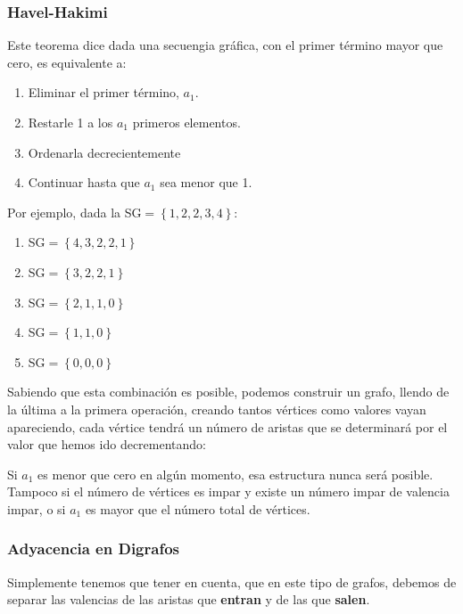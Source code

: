 \subsubsection{Havel-Hakimi}
Este teorema dice dada una secuengia gráfica, con el primer término mayor que cero, es equivalente a:
\begin{enumerate}
        \item Eliminar el primer término, \(a_1\).
        \item Restarle 1 a los \(a_1\) primeros elementos.
        \item Ordenarla decrecientemente
        \item Continuar hasta que \(a_1\) sea menor que 1.
\end{enumerate}
Por ejemplo, dada la SG\(=\left\{1,2,2,3,4\right\} \):
\begin{enumerate}
        \item SG\(=\left\{4,3,2,2,1\right\}\)
        \item SG\(=\left\{3,2,2,1\right\}\)
        \item SG\(=\left\{2,1,1,0\right\}\)
        \item SG\(=\left\{1,1,0\right\}\)
        \item SG\(=\left\{0,0,0\right\}\)
\end{enumerate}
Sabiendo que esta combinación es posible, podemos construir un grafo, llendo de la última a la primera operación, creando tantos vértices como valores vayan apareciendo, cada vértice tendrá un número de aristas que se determinará por el valor que hemos ido decrementando: \par
{}
Si \(a_1\) es menor que cero en algún momento, esa estructura nunca será posible. Tampoco si el número de vértices es impar y existe un número impar de valencia impar, o si \(a_1\) es mayor que el número total de vértices.
\subsubsection{Adyacencia en Digrafos}
Simplemente tenemos que tener en cuenta, que en este tipo de grafos, debemos de separar las valencias de las aristas que \textbf{entran} y de las que \textbf{salen}.
